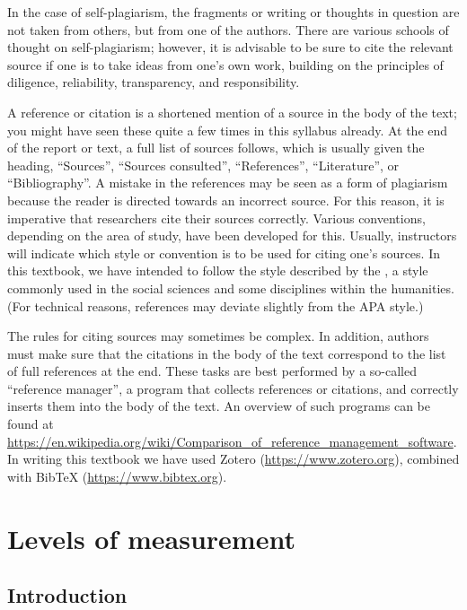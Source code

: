 \documentclass[
]{book}
\begin{document}
In the case of self-plagiarism, the fragments or writing or thoughts in question are not taken from others, but from one of the authors. There are various schools of thought on self-plagiarism; however, it is advisable to be sure to cite the relevant source if one is to take ideas from one's own work, building on the principles of diligence, reliability, transparency, and responsibility.

A reference or citation is a shortened mention of a source in the body of the text; you might have seen these quite a few times in this syllabus already. At the end of the report or text, a full list of sources follows, which is usually given the heading, ``Sources'', ``Sources consulted'', ``References'', ``Literature'', or ``Bibliography''. A mistake in the references may be seen as a form of plagiarism \citep{UBVU15} because the reader is directed towards an incorrect source. For this reason, it is imperative that researchers cite their sources correctly. Various conventions, depending on the area of study, have been developed for this. Usually, instructors will indicate which style or convention is to be used for citing one's sources. In this textbook, we have intended to follow the style described by the \citet{APA10}, a style commonly used in the social sciences and some disciplines within the humanities.
(For technical reasons, references may deviate slightly from the APA style.)

The rules for citing sources may sometimes be complex. In addition, authors must make sure that the citations in the body of the text correspond to the list of full references at the end. These tasks are best performed by a so-called ``reference manager'', a program that collects references or citations, and correctly inserts them into the body of the text. An overview of such programs can be found at
\url{https://en.wikipedia.org/wiki/Comparison_of_reference_management_software}.
In writing this textbook we have used Zotero (\url{https://www.zotero.org}),
combined with BibTeX (\url{https://www.bibtex.org}).

\chapter{Levels of measurement}\label{ch-levelsofmeasurement}

\section{Introduction}\label{introduction-1}
\end{document}
